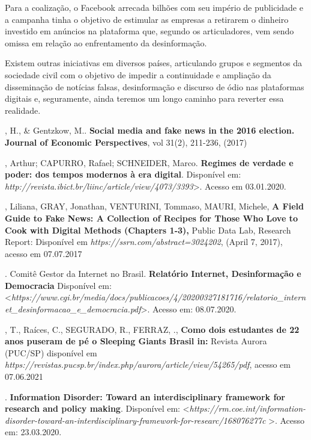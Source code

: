 Para a coalização, o Facebook arrecada bilhões com seu império de
publicidade e a campanha tinha o objetivo de estimular as empresas a
retirarem o dinheiro investido em anúncios na plataforma que, segundo os
articuladores, vem sendo omissa em relação ao enfrentamento da
desinformação.

Existem outras iniciativas em diversos países, articulando grupos e
segmentos da sociedade civil com o objetivo de impedir a continuidade e
ampliação da disseminação de notícias falsas, desinformação e discurso
de ódio nas plataformas digitais e, seguramente, ainda teremos um longo
caminho para reverter essa realidade.


\begin{bibliohedra}
, H., \& Gentzkow, M.. \textbf{Social media and fake news in the
2016 election. Journal of Economic Perspectives}, vol 31(2), 211-236,
(2017)

, Arthur; CAPURRO, Rafael; SCHNEIDER, Marco. \textbf{Regimes de
verdade e poder: dos tempos modernos à era digital}. Disponível em:
\textit{http://revista.ibict.br/liinc/article/view/4073/3393}\textgreater{}.
Acesso em 03.01.2020.

, Liliana, GRAY, Jonathan, VENTURINI, Tommaso, MAURI, Michele,
\textbf{A Field Guide to Fake News: A Collection of Recipes for Those
Who Love to Cook with Digital Methods (Chapters 1-3),} Public Data Lab,
Research Report: Disponível em
\textit{https://ssrn.com/abstract=3024202},
(April 7, 2017), acesso em 07.07.2017

. Comitê Gestor da Internet no Brasil. \textbf{Relatório Internet,
Desinformação e Democracia} Disponível em:
\textless{}\textit{https://www.cgi.br/media/docs/publicacoes/4/20200327181716/relatorio\_internet\_desinformacao\_e\_democracia.pdf}\textgreater{}.
Acesso em: 08.07.2020.

, T., Raíces, C., SEGURADO, R., FERRAZ, ., \textbf{Como dois
estudantes de 22 anos puseram de pé o Sleeping Giants Brasil in:}
Revista Aurora (PUC/SP) disponível em \textit{https://revistas.pucsp.br/index.php/aurora/article/view/54265/pdf},
acesso em 07.06.2021

. \textbf{Information Disorder: Toward an
interdisciplinary framework for research and policy making}. Disponível
em:
\textless{}\textit{https://rm.coe.int/information-disorder-toward-an-interdisciplinary-framework-for-researc/168076277c}
\textgreater{}. Acesso em: 23.03.2020.


\end{bibliohedra}
